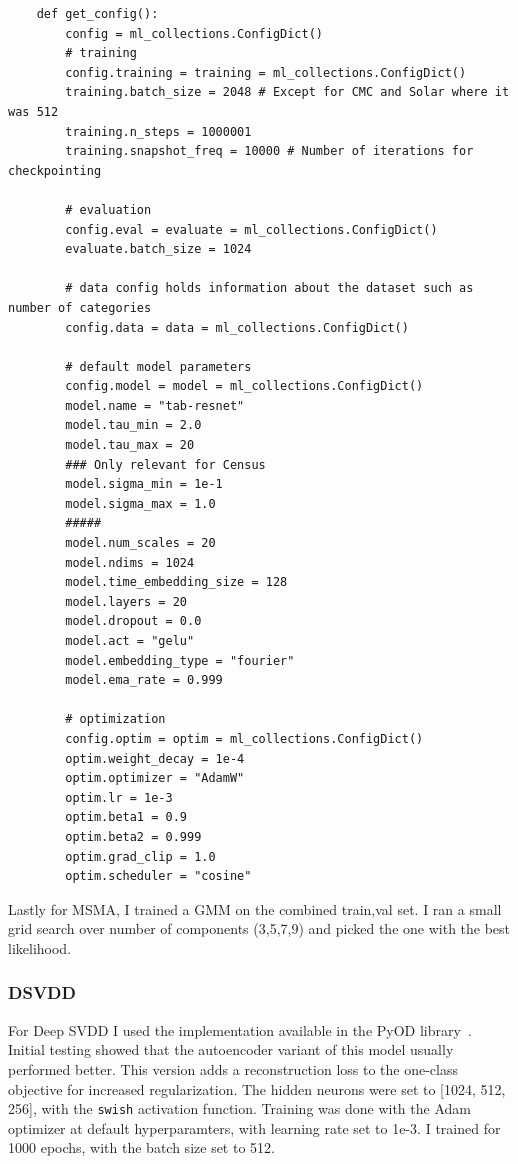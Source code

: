 \begin{verbatim}
    def get_config():
        config = ml_collections.ConfigDict()
        # training
        config.training = training = ml_collections.ConfigDict()
        training.batch_size = 2048 # Except for CMC and Solar where it was 512
        training.n_steps = 1000001
        training.snapshot_freq = 10000 # Number of iterations for checkpointing
    
        # evaluation
        config.eval = evaluate = ml_collections.ConfigDict()
        evaluate.batch_size = 1024
    
        # data config holds information about the dataset such as number of categories
        config.data = data = ml_collections.ConfigDict()
    
        # default model parameters
        config.model = model = ml_collections.ConfigDict()
        model.name = "tab-resnet"
        model.tau_min = 2.0
        model.tau_max = 20
        ### Only relevant for Census
        model.sigma_min = 1e-1
        model.sigma_max = 1.0
        #####
        model.num_scales = 20
        model.ndims = 1024
        model.time_embedding_size = 128
        model.layers = 20
        model.dropout = 0.0
        model.act = "gelu"
        model.embedding_type = "fourier"
        model.ema_rate = 0.999

        # optimization
        config.optim = optim = ml_collections.ConfigDict()
        optim.weight_decay = 1e-4
        optim.optimizer = "AdamW"
        optim.lr = 1e-3
        optim.beta1 = 0.9
        optim.beta2 = 0.999
        optim.grad_clip = 1.0
        optim.scheduler = "cosine"
\end{verbatim}

Lastly for MSMA, I trained a GMM on the combined train,val set. I ran a small grid search over number of components (3,5,7,9) and picked the one with the best likelihood.

\subsubsection*{DSVDD}
For Deep SVDD I used the implementation available in the PyOD library~\cite{zhao2019pyod}. Initial testing showed that the autoencoder variant of this model usually performed better. This version adds a reconstruction loss to the one-class objective for increased regularization. The hidden neurons were set to [1024, 512, 256], with the \texttt{swish} activation function. Training was done with the Adam optimizer at default hyperparamters, with learning rate set to 1e-3. I trained for 1000 epochs, with the batch size set to 512.

